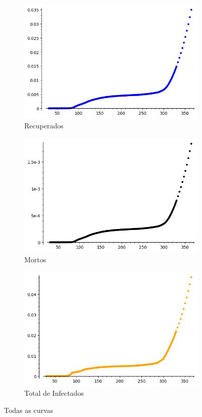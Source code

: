 \documentclass{article}
\begin{document}
\begin{figure}[H]
    \begin{subfigure}{.33\textwidth}
        \centering
        \includegraphics[width = .8\linewidth]{Imagens/R.png}
        \caption{Recuperados}
        \label{fig:R}
    \end{subfigure}
    \begin{subfigure}{.33\textwidth}
        \centering
        \includegraphics[width = .8\linewidth]{Imagens/D.png}
        \caption{Mortos}
        \label{fig:D}
    \end{subfigure}
    \begin{subfigure}{.33\textwidth}
        \centering
        \includegraphics[width = .8\linewidth]{Imagens/T.png}
        \caption{Total de Infectados}
        \label{fig:T}
    \end{subfigure}
    
    \caption{Todas as curvas}
    \label{fig:all}
\end{figure}
\end{document}
